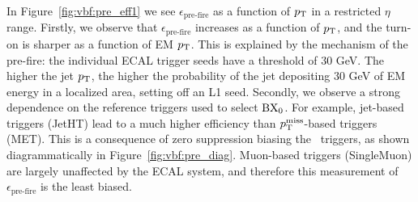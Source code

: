 In Figure~\ref{fig:vbf:pre_eff1} we see $\epsilon_\text{pre-fire}$ as a function of $p_\mathrm{T}$ in a restricted $\eta$ range.
Firstly, we observe that $\epsilon_\text{pre-fire}$ increases as a function of $p_\mathrm{T}$, and the turn-on is sharper as a function of EM $p_\mathrm{T}$. 
This is explained by the mechanism of the pre-fire: the individual ECAL trigger seeds have a threshold of 30 GeV.
The higher the jet $p_\mathrm{T}$, the higher the probability of the jet depositing $30$ GeV of EM energy in a localized area, setting off an L1 seed. 
Secondly, we observe a strong dependence on the reference triggers used to select ${\mathrm{BX}_{0}}$.
For example, jet-based triggers (JetHT) lead to a much higher efficiency than $p_\mathrm{T}^\mathrm{miss}$-based triggers (MET).  
This is a consequence of zero suppression biasing the ~triggers, as shown diagrammatically in Figure~\ref{fig:vbf:pre_diag}.
Muon-based triggers (SingleMuon) are largely unaffected by the ECAL system, and therefore this measurement of $\epsilon_\text{pre-fire}$ is the least biased.  


